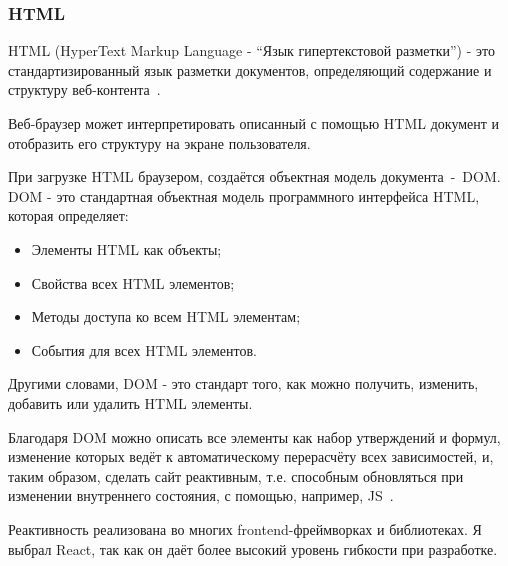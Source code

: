 \subsubsection{HTML}

HTML (HyperText Markup Language - ``Язык гипертекстовой разметки'') - это стандартизированный язык разметки документов, определяющий содержание и структуру веб-контента~\cite{HTML}.

Веб-браузер может интерпретировать описанный с помощью HTML документ и отобразить его структуру на экране пользователя.

При загрузке HTML браузером, создаётся объектная модель документа~-~DOM. DOM - это стандартная объектная модель программного интерфейса HTML, которая определяет:

\begin{itemize}
  \item Элементы HTML как объекты;
  \item Свойства всех HTML элементов;
  \item Методы доступа ко всем HTML элементам;
  \item События для всех HTML элементов.
\end{itemize}

Другими словами, DOM - это стандарт того, как можно получить, изменить, добавить или удалить HTML элементы.

Благодаря DOM можно описать все элементы как набор утверждений и формул, изменение которых ведёт к автоматическому перерасчёту всех зависимостей, и, таким образом, сделать сайт реактивным, т.е. способным обновляться при изменении внутреннего состояния, с помощью, например, JS~\cite{HTML}.

Реактивность реализована во многих frontend-фреймворках и библиотеках. Я выбрал React, так как он даёт более высокий уровень гибкости при разработке.